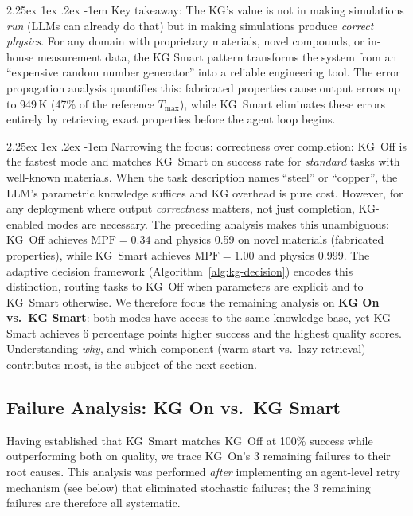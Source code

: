 \documentclass[preprint,review,12pt]{elsarticle}
\makeatletter
\renewcommand\paragraph{\@startsection{paragraph}{4}{\z@}%
  {2.25ex \@plus1ex \@minus.2ex}%
  {-1em}%
  {\normalfont\normalsize\bfseries}}
\makeatother
\begin{document}
\paragraph{Key takeaway:}
The KG's value is not in making simulations \emph{run} (LLMs can
already do that) but in making simulations produce
\emph{correct physics}.  For any domain with proprietary materials,
novel compounds, or in-house measurement data, the KG Smart pattern
transforms the system from an ``expensive random number generator''
into a reliable engineering tool.  The error propagation analysis
quantifies this: fabricated properties cause output errors up to
949\,K (47\% of the reference $T_{\max}$), while KG~Smart eliminates
these errors entirely by retrieving exact properties before the agent
loop begins.

\paragraph{Narrowing the focus: correctness over completion:}
KG~Off is the fastest mode and matches KG~Smart on success rate for
\emph{standard} tasks with well-known materials.  When the task
description names ``steel'' or ``copper'', the LLM's parametric
knowledge suffices and KG overhead is pure cost.  However, for any
deployment where output \emph{correctness} matters, not just
completion, KG-enabled modes are necessary.  The preceding analysis
makes this unambiguous: KG~Off achieves $\text{MPF}{=}0.34$ and
physics 0.59 on novel materials (fabricated properties), while
KG~Smart achieves $\text{MPF}{=}1.00$ and physics 0.999.
The adaptive decision framework (Algorithm~\ref{alg:kg-decision})
encodes this distinction, routing tasks to KG~Off when
parameters are explicit and to KG~Smart otherwise.  We therefore focus
the remaining analysis on \textbf{KG On vs.\ KG Smart}: both modes
have access to the same knowledge base, yet KG Smart achieves 6
percentage points higher success and the highest quality scores.
Understanding \emph{why}, and which component (warm-start vs.\ lazy
retrieval) contributes most, is the subject of the next section.

\subsection{Failure Analysis: KG On vs.\ KG Smart}
\label{sec:failure-analysis}

Having established that KG~Smart matches KG~Off at 100\% success while
outperforming both on quality, we trace KG~On's 3 remaining failures
to their root causes.  This analysis was performed \emph{after}
implementing an agent-level retry mechanism (see below) that
eliminated stochastic failures; the 3 remaining failures are therefore
all systematic.
\end{document}
